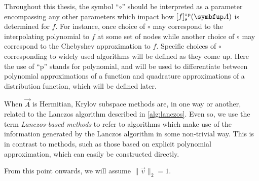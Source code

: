Throughout this thesis, the symbol ``\( \circ \)'' should be interpreted as a parameter encompassing any other parameters which impact how \( \ff{f}{s}\mf{\vec{A}}  \) is determined for \( f \). 
For instance, once choice of \( \circ \) may correspond to the interpolating polynomial to \( f \) at some set of nodes while another choice of \( \circ \) may correspond to the Chebyshev approximation to \( f \).
Specific choices of \( \circ \) corresponding to widely used algorithms will be defined as they come up.
Here the use of ``p'' stands for polynomial, and will be used to differentiate between polynomial approximations of a function and quadrature approximations of a distribution function, which will be defined later.

\begin{remark}
When \( \vec{A} \) is Hermitian, Krylov subspace methods are, in one way or another, related to the Lanczos algorithm \cite{lanczos_50} described in \cref{alg:lanczos}.
    Even so, we use the term \emph{Lanczos-based methods} to refer to algorithms which make use of the information generated by the Lanczos algorithm in some non-trivial way. 
This is in contrast to methods, such as those based on explicit polynomial approximation, which can easily be constructed directly.
\end{remark}

\begin{assumption}
    From this point onwards, we will assume \( \|\vec{v}\|_2=1 \).
\end{assumption}


